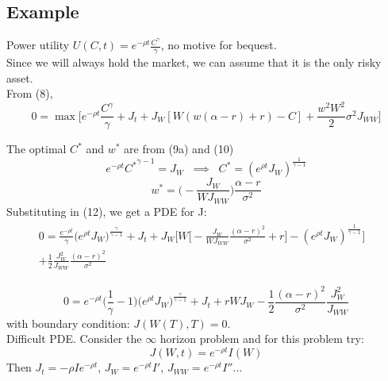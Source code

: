\documentclass[
14pt,notheorems,hyperref={pdfauthor=whatever}
]{beamer}
\begin{document}
\subsection{Example}
\begin{frame}
Power utility $U(C,t) = e^{-\rho t}\frac{C^\gamma}{\gamma}$, no motive for bequest.\\
\hfill\break
Since we will always hold the market, we can assume that it is the only risky asset.\\
\hfill\break
From (8),
\begin{equation} \tag{12}
    0 = \max \Bigg[ e^{-\rho t}\frac{C^\gamma}{\gamma} + J_t + J_W[W(w(\alpha-r)+r)-C] + \frac{w^2W^2}{2}\sigma^2 J_{WW} \Bigg]
\end{equation}
\end{frame}

\begin{frame}
The optimal $C^*$ and $w^*$ are from (9a) and (10)\\
\[ e^{-\rho t}{C^*}^{\gamma-1} = J_W \;\;\implies\;\; C^* = (e^{\rho t}J_W)^{\frac{1}{\gamma-1}}\]
\[ w^* = \bigg(-\frac{J_W}{W J_{WW}}\bigg) \frac{\alpha-r}{\sigma^2} \]
Substituting in (12), we get a PDE for J:
\begin{align*}
\begin{split}
    0 = \frac{e^{-\rho t}}{\gamma} \bigg(e^{\rho t}J_W\bigg)^{\frac{\gamma}{\gamma-1}} + J_t + J_W\Bigg[ W\bigg[-\frac{J_W}{W J_{WW}}\frac{(\alpha-r)^2}{\sigma^2}+r\bigg] - (e^{\rho t}J_W)^{\frac{1}{\gamma-1}} \Bigg]&
    \\
    + \frac{1}{2}\frac{J_W^2}{J_{WW}} \frac{(\alpha-r)^2}{\sigma^2}&
\end{split}
\end{align*}
\end{frame}

\begin{frame}
\begin{equation} \tag{13}
    0 = e^{-\rho t} \bigg(\frac{1}{\gamma}-1\bigg)\bigg(e^{\rho t}J_W\bigg)^{\frac{\gamma}{\gamma-1}} + J_t + rWJ_W-\frac{1}{2}\frac{(\alpha-r)^2}{\sigma^2}\frac{J_W^2}{J_{WW}}
\end{equation}
with boundary condition: $J(W(T),T)=0$.\\
\hfill\break
Difficult PDE. Consider the $\infty$ horizon problem and for this problem try:\\
\[ J(W,t) = e^{-\rho t}I(W)\]
Then $J_t = -\rho I e^{-\rho t}$, $J_W = e^{-\rho t} I'$, $J_{WW} = e^{-\rho t} I''$...
\end{frame}
\end{document}
